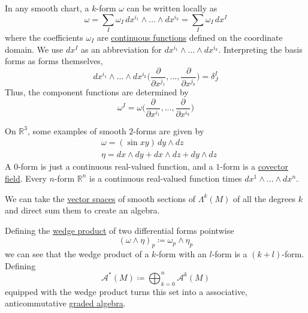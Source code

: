 \documentclass{article}
\newcounter{definition}[section]
\newcounter{example}[section]
\begin{document}
    In any smooth chart, a $k$-form $\omega$ can be written locally as 
    \begin{equation}
      \omega = \sum_I \omega_I \, dx^{i_1} \wedge ... \wedge dx^{i_k} = \sum_I \omega_I \, dx^I
    \end{equation}
    where the coefficients $\omega_I$ are \hyperref[pst-def:continuous_func]{continuous functions} defined on the coordinate domain. We use $dx^I$ as an abbreviation for $dx^{i_1} \wedge ... \wedge dx^{i_k}$. Interpreting the basis forms as forms themselves, 
    \begin{equation}
      dx^{i_1} \wedge ... \wedge dx^{i_k} \bigg( \frac{\partial}{\partial x^{j_1}}, ..., \frac{\partial}{\partial x^{j_k}} \bigg) = \delta^I_J
    \end{equation}
    Thus, the component functions are determined by
    \begin{equation}
      \omega^I = \omega \bigg( \frac{\partial}{\partial x^{i_1}}, ... ,\frac{\partial}{\partial x^{i_k}} \bigg)
    \end{equation}

    \begin{example}
      \label{ex:smooth-2-forms-on-r3}
    On $\mathbb{R}^3$, some examples of smooth $2$-forms are given by 
    \begin{align*}
        & \omega = (\sin{xy}) \,dy \wedge dz \\
        & \eta = dx \wedge dy + dx \wedge dz + dy \wedge dz 
    \end{align*}
    A $0$-form is just a continuous real-valued function, and a $1$-form is a \hyperref[def:covector-field]{covector field}. Every $n$-form $\mathbb{R}^n$ is a continuous real-valued function times $dx^1 \wedge ... \wedge dx^n$. 
    \end{example}

    We can take the \hyperref[lin-def:vector-space]{vector spaces} of smooth sections of $\Lambda^k (M)$ of all the degrees $k$ and direct sum them to create an algebra. 

    \begin{definition}
      \label{def:wedge-product-of-differential-forms}
    Defining the \hyperref[def:wedge-product]{wedge product} of two differential forms pointwise
    \begin{equation}
      (\omega \wedge \eta)_p \coloneqq \omega_p \wedge \eta_p
    \end{equation}
    we can see that the wedge product of a $k$-form with an $l$-form is a $(k+l)$-form. Defining 
    \begin{equation}
      \mathcal{A}^* (M) \coloneqq \bigoplus_{k=0}^n \mathcal{A}^k (M)
    \end{equation}
    equipped with the wedge product turns this set into a associative, anticommutative \hyperref[def:graded-algebra]{graded algebra}. 
    \end{definition}
\end{document}
